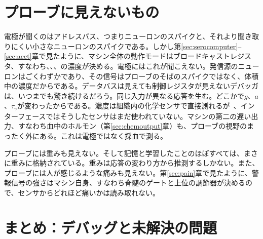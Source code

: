 \section{プローブに見えないもの}

電極が聞くのはアドレスバス、つまりニューロンのスパイクと、それより聞き取りにくい小さなニューロンのスパイクである。しかし第\ref{sec:serocomputer}--\ref{sec:acet}章で見たように、マシン全体の動作モードはブロードキャストレジスタ、すなわち、、、の濃度が決める。電極にはこれが聞こえない。発信源のニューロンはごくわずかであり、その信号はプローブのそばのスパイクではなく、体積中の濃度だからである。データバスは見えても制御レジスタが見えないデバッガは、いつまでも驚き続けるだろう。同じ入力が異なる応答を生む。どこかで$g$、$a$、$\tau_\gamma$が変わったからである。濃度は組織内の化学センサで直接測れるが~\cite{Bunin1998}、インターフェースではそうしたセンサはまだ使われていない。マシンの第二の遅い出力、すなわち血中のホルモン（第\ref{sec:chemoutput}章）も、プローブの視野のまったく外にある。これは電極ではなく採血で測る。

プローブには重みも見えない。そして記憶と学習したことのほぼすべては、まさに重みに格納されている。重みは応答の変わり方から推測するしかない。また、プローブには人が感じるような痛みも見えない。第\ref{sec:pain}章で見たように、警報信号の強さはマシン自身、すなわち脊髄のゲートと上位の調節器が決めるので、センサからどれほど痛いかは読み取れない。

\section{まとめ：デバッグと未解決の問題}

